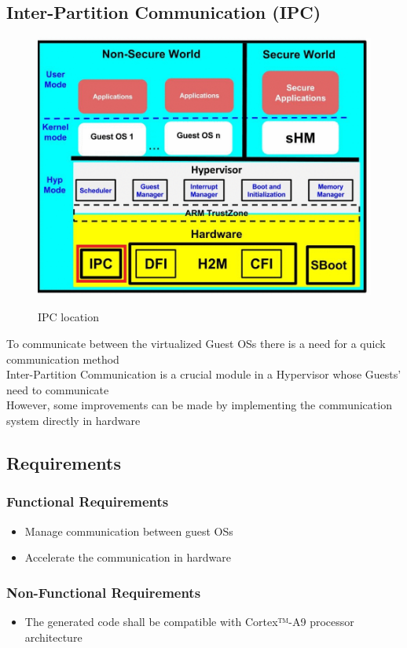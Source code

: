 \subsection{Inter-Partition Communication (IPC)}
\begin{figure}[!htbp]
\center
\label{figure7}
\includegraphics[scale=0.35]{Figures/IPC} \\
\caption {IPC location}
\end{figure}
To communicate between the virtualized Guest OSs there is a need for a quick communication method\\
\indent Inter-Partition Communication is a crucial module in a Hypervisor whose Guests’ need to communicate\\
\indent However, some improvements can be made by implementing the communication system directly in hardware

\subsection{Requirements}

\subsubsection{Functional Requirements}
\begin{itemize}
\item Manage communication between guest OSs
\item Accelerate the communication in hardware
\end{itemize}
\subsubsection{Non-Functional Requirements}
\begin{itemize}
\item The generated code shall be compatible with Cortex™-A9 processor architecture
\end{itemize}

